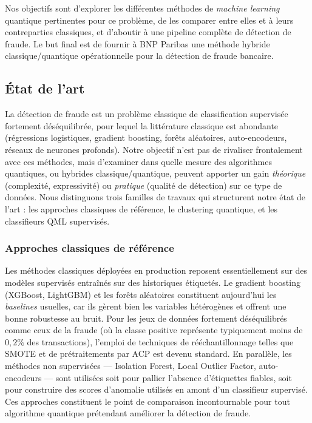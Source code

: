 \documentclass[a4paper]{article}
\begin{document}
Nos objectifs sont d'explorer les différentes méthodes de \textit{machine learning} quantique pertinentes pour ce problème, de les comparer entre elles et à leurs contreparties classiques, et d'aboutir à une pipeline complète de détection de fraude. Le but final est de fournir à BNP Paribas une méthode hybride classique/quantique opérationnelle pour la détection de fraude bancaire.

\subsection{État de l'art}

La détection de fraude est un problème classique de classification supervisée fortement déséquilibrée, pour lequel la littérature classique est abondante (régressions logistiques, gradient boosting, forêts aléatoires, auto-encodeurs, réseaux de neurones profonds). Notre objectif n'est pas de rivaliser frontalement avec ces méthodes, mais d'examiner dans quelle mesure des algorithmes quantiques, ou hybrides classique/quantique, peuvent apporter un gain \emph{théorique} (complexité, expressivité) ou \emph{pratique} (qualité de détection) sur ce type de données. Nous distinguons trois familles de travaux qui structurent notre état de l'art : les approches classiques de référence, le clustering quantique, et les classifieurs QML supervisés.

\subsubsection{Approches classiques de référence}

Les méthodes classiques déployées en production reposent essentiellement sur des modèles supervisés entraînés sur des historiques étiquetés. Le gradient boosting (XGBoost, LightGBM) et les forêts aléatoires constituent aujourd'hui les \emph{baselines} usuelles, car ils gèrent bien les variables hétérogènes et offrent une bonne robustesse au bruit. Pour les jeux de données fortement déséquilibrés comme ceux de la fraude (où la classe positive représente typiquement moins de $0{,}2\%$ des transactions), l'emploi de techniques de rééchantillonnage telles que SMOTE \cite{chawla2002smote} et de prétraitements par ACP est devenu standard. En parallèle, les méthodes non supervisées — Isolation Forest, Local Outlier Factor, auto-encodeurs — sont utilisées soit pour pallier l'absence d'étiquettes fiables, soit pour construire des scores d'anomalie utilisés en amont d'un classifieur supervisé. Ces approches constituent le point de comparaison incontournable pour tout algorithme quantique prétendant améliorer la détection de fraude.
\end{document}

